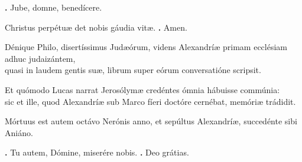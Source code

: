\begin{small}
\textbf{\Vbar.} Jube, domne, benedícere.

Christus perpétuæ det nobis gáudia vitæ.
\textbf{\Rbar.} Amen.
\end{small}


Dénique Philo, disertíssimus Judæórum, videns Alexandríæ primam ecclésiam adhuc judaizántem, \\
quasi in laudem gentis suæ, librum super eórum conversatióne scripsit. 

Et quómodo Lucas narrat Jerosólymæ credéntes ómnia hábuisse commúnia:\\
sic et ille, quod Alexandríæ sub Marco fíeri doctóre cernébat, memóriæ trádidit. 

Mórtuus est autem octávo Nerónis anno, et sepúltus Alexandríæ, succedénte sibi Aniáno.

\textbf{\Vbar.} Tu autem, Dómine, miserére nobis.
\textbf{\Rbar.} Deo grátias.

